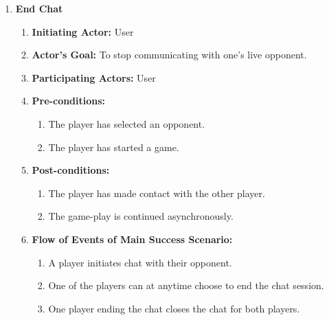 \documentclass[12pt, titlepage]{article}
\begin{document}
\begin{enumerate}[{UC}1.]
                \item \textbf{End Chat}
                    \begin{enumerate}[{ }]
                        \item \textbf{Initiating Actor:}
                            User
                            
                        \item \textbf{Actor's Goal:}
                            To stop communicating with one's live opponent.
                            
                        \item \textbf{Participating Actors:}
                            User
                            
                        \item \textbf{Pre-conditions:}
                            \begin{enumerate}
                                \item The player has selected an opponent.
                                \item The player has started a game.
                            \end{enumerate}
                        \item \textbf{Post-conditions:}
                            \begin{enumerate}
                                \item The player has made contact with the other player.
                                \item The game-play is continued asynchronously.
                            \end{enumerate}
                        \item \textbf{Flow of Events of Main Success Scenario:}
                           \begin{enumerate}
                                \item A player initiates chat with their opponent.
                                \item One of the players can at anytime choose to end the chat session.
                                \item One player ending the chat closes the chat for both players.
                            \end{enumerate}
                    \end{enumerate}
                    

\end{enumerate}
\end{document}
